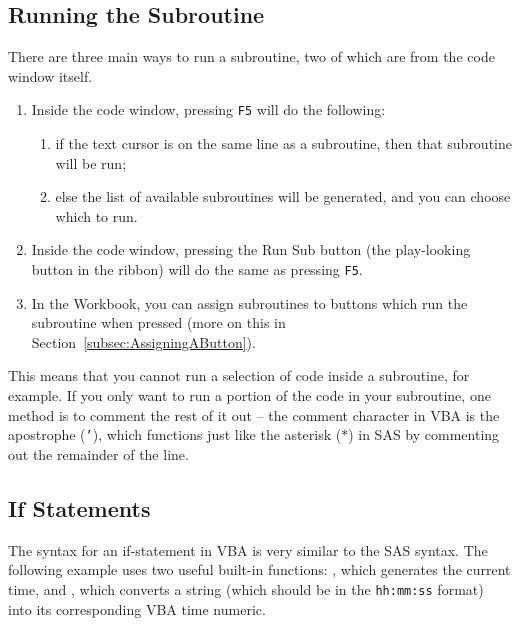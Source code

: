 \documentclass[11pt]{article}%
\begin{document}

\subsection{Running the Subroutine}\label{subsec:RunningTheSubroutine}

There are three main ways to run a subroutine, two of which are from the code window itself.
\begin{enumerate}
    \item Inside the code window, pressing \texttt{F5} will do the following:
    \begin{enumerate}
        \item if the text cursor is on the same line as a subroutine, then that subroutine will be run;
        \item else the list of available subroutines will be generated, and you can choose which to run.
    \end{enumerate}
    \item Inside the code window, pressing the Run Sub button (the play-looking button in the ribbon) will do the same as pressing \texttt{F5}.
    \item In the Workbook, you can assign subroutines to buttons which run the subroutine when pressed (more on this in Section~\ref{subsec:AssigningAButton}).
\end{enumerate}

This means that you cannot run a selection of code inside a subroutine, for example. If you only want to run a portion of the code in your subroutine, one method is to comment the rest of it out -- the comment character in VBA is the apostrophe (\texttt{'}), which functions just like the asterisk (\(\ast\)) in SAS by commenting out the remainder of the line.


\subsection{If Statements}

The syntax for an if-statement in VBA is very similar to the SAS syntax. The following example uses two useful built-in functions: , which generates the current time, and , which converts a string (which should be in the \texttt{hh:mm:ss} format) into its corresponding VBA time numeric.\\
\end{document}
